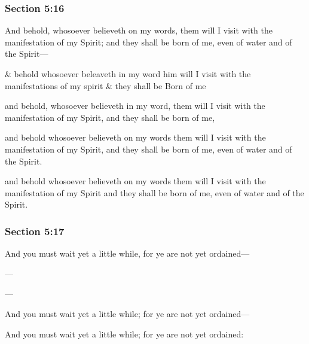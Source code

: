 	\subsubsection{Section 5:16} %
		\label{DC5-16}

		And behold, whosoever believeth on my words, them will I visit with the manifestation of my Spirit; and they shall be born of me, even of water and of the Spirit---

		\begin{framed}
		\scriptsize
			\begin{compactdesc}
				\item[JSP] \& behold whosoever beleaveth in my word him will I visit with the manifestations of my spirit \& they shall be Born of me
				\item[RB1] [\textit{missing}]
				\item[BC] and behold, whosoever believeth in my word, them will I visit with the manifestation of my Spirit, and they shall be born of me,
				\item[DC 1835] and behold whosoever believeth on my words them will I visit with the manifestation of my Spirit, and they shall be born of me, even of water and of the Spirit.
				\item[DC 1844] and behold whosoever believeth on my words them will I visit with the manifestation of my Spirit and they shall be born of me, even of water and of the Spirit.
			\end{compactdesc}
		\end{framed}

	\subsubsection{Section 5:17} %
		\label{DC5-17}

		And you must wait yet a little while, for ye are not yet ordained---

		\begin{framed}
		\scriptsize
			\begin{compactdesc}
				\item[JSP] ---
				\item[RB1] [\textit{missing}]
				\item[BC] ---
				\item[DC 1835] And you must wait yet a little while; for ye are not yet ordained---
				\item[DC 1844] And you must wait yet a little while; for ye are not yet ordained:
			\end{compactdesc}
		\end{framed}

